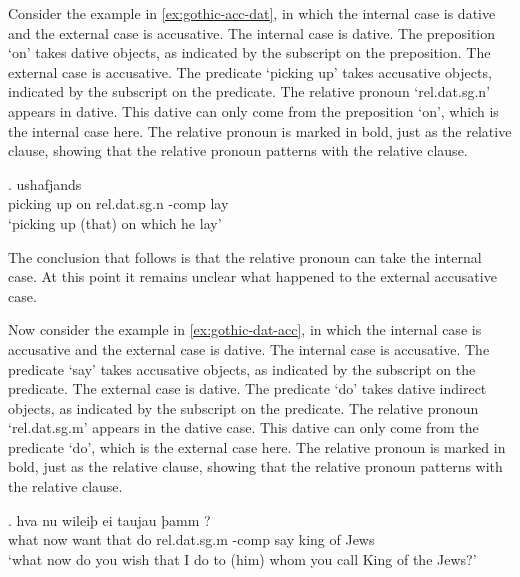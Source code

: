 Consider the example in \ref{ex:gothic-acc-dat}, in which the internal case is dative and the external case is accusative.
The internal case is dative. The preposition  `on' takes dative objects, as indicated by the subscript on the preposition.
The external case is accusative. The predicate  `picking up' takes accusative objects, indicated by the subscript on the predicate.
The relative pronoun  `\ac{rel}.\ac{dat}.\ac{sg}.\ac{n}' appears in dative. This dative can only come from the preposition  `on', which is the internal case here. The relative pronoun is marked in bold, just as the relative clause, showing that the relative pronoun patterns with the relative clause.

\exg. ushafjands    \\
 {picking up}\scsub{[acc]} on\scsub{[dat]} \ac{rel}.\ac{dat}.\ac{sg}.\ac{n} -\ac{comp} lay\\
 `picking up (that) on which he lay' \label{ex:gothic-acc-dat}

The conclusion that follows is that the relative pronoun can take the internal case. At this point it remains unclear what happened to the external accusative case.

Now consider the example in \ref{ex:gothic-dat-acc}, in which the internal case is accusative and the external case is dative.
The internal case is accusative. The predicate  `say' takes accusative objects, as indicated by the subscript on the predicate.
The external case is dative. The predicate  `do' takes dative indirect objects, as indicated by the subscript on the predicate.
The relative pronoun  `\ac{rel}.\ac{dat}.\ac{sg}.\ac{m}' appears in the dative case. This dative can only come from the predicate  `do', which is the external case here. The relative pronoun is marked in bold, just as the relative clause, showing that the relative pronoun patterns with the relative clause.

\exg. hva nu wileiþ ei taujau þamm    ?\\
 what now want that do\scsub{[dat]} \ac{rel}.\ac{dat}.\ac{sg}.\ac{m} -\ac{comp} say\scsub{[acc]} king {of Jews}\\
 `what now do you wish that I do to (him) whom you call King of the Jews?' \label{ex:gothic-dat-acc}

